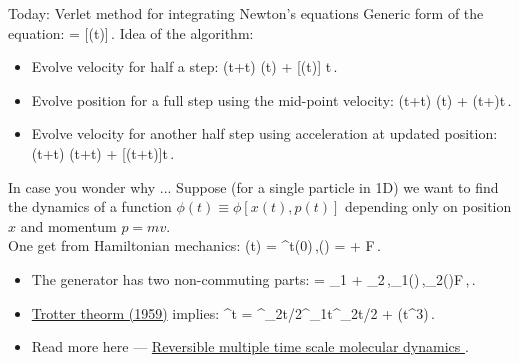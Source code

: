 \documentclass[11pt,aspectratio=169,handout]{beamer}
\begin{document}
\begin{frame}{Today: Verlet method for integrating Newton's equations}
		Generic form of the equation:
	\bea
	 = [(t)]\,.
	\eea\pause
	Idea of the algorithm:\pause
	\begin{itemize}[<+->]
		\item Evolve velocity for half a step: 
		\bea
			\left(t+\Delta t\right) \simeq {}(t) + [(t)] \Delta t\,.
		\eea
		\item Evolve position for a full step using the mid-point velocity:
		\bea
			(t+\Delta t) \simeq {}(t) + \left(t+\Delta\right)\Delta t\,.
		\eea
		\item Evolve velocity for another half step using acceleration at updated position:
		\bea
			(t+\Delta t) \simeq 	{}\left(t+\Delta t\right) + [(t+\Delta t)]\Delta t\,.
		\eea
	\end{itemize}
\end{frame}

\begin{frame}{In case you wonder why ...}\pause
	Suppose (for a single particle in 1D) we want to find the dynamics of a function $\phi(t)\equiv \phi[x(t), p(t)]$ depending only on position $x$ and momentum $p = mv$.\pause\\
	One get from Hamiltonian mechanics:
	\bea
		\phi(t) = \rme^{\rmi \lcal t}\phi(0)\,,\quad \rmi\lcal(\bigcdot) = \cdot{} + F\cdot\dfrac{\partial(\bigcdot)}{\partial p}\,.
	\eea\pause
	\begin{itemize}[<+->]
		\item The generator has two non-commuting parts: 
		\bea
			\rmi\lcal = \rmi\lcal_1 + \rmi\lcal_2\,,\quad\rmi\lcal_1(\bigcdot)\equiv{}\cdot{}\,,\quad\rmi\lcal_2(\bigcdot)\equiv F\cdot{}\,,\neq 0\,.
		\eea
		\item \href{https://www.jstor.org/stable/2033649?seq=7}{Trotter theorm (1959)} implies:
		\bea
			\rme^{\rmi\lcal\Delta t} = \rme^{\rmi\lcal_2\Delta t/2}\cdot\rme^{\rmi\lcal_1\Delta t}\cdot\rme^{\rmi\lcal_2\Delta t/2} + \ocal(\Delta t^3)\,.
		\eea
		\item Read more here --- \href{https://doi.org/10.1063/1.463137}{Reversible multiple time scale molecular dynamics }.
	\end{itemize}
\end{frame}
\end{document}
